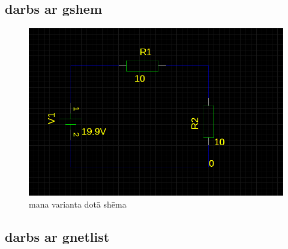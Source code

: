 \documentclass{report}
\begin{document}
\subsection{darbs ar gshem}
\begin{figure}[!h]
\includegraphics[width=14cm]{01_sch.png}
\caption{mana varianta dotā shēma}
\end{figure}
\subsection{darbs ar gnetlist}

\end{document}
